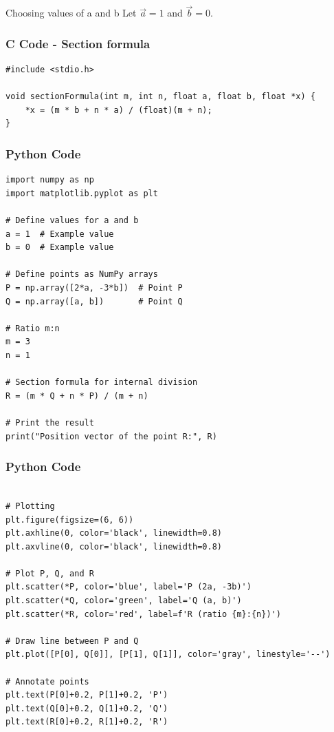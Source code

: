 \documentclass{beamer}
\begin{document}
\begin{frame}{Choosing values of a and b}
Let $\vec{a}=1$ and $\vec{b}=0$.
\end{frame}

\begin{frame}[fragile]
    \frametitle{C Code - Section formula}

    \begin{lstlisting}
#include <stdio.h>

void sectionFormula(int m, int n, float a, float b, float *x) {
    *x = (m * b + n * a) / (float)(m + n);
}

    \end{lstlisting}
\end{frame}

\begin{frame}[fragile]
    \frametitle{Python Code}

    \begin{lstlisting}
import numpy as np
import matplotlib.pyplot as plt

# Define values for a and b
a = 1  # Example value
b = 0  # Example value

# Define points as NumPy arrays
P = np.array([2*a, -3*b])  # Point P
Q = np.array([a, b])       # Point Q

# Ratio m:n
m = 3
n = 1

# Section formula for internal division
R = (m * Q + n * P) / (m + n)

# Print the result
print("Position vector of the point R:", R)

    \end{lstlisting}
\end{frame}

\begin{frame}[fragile]
    \frametitle{Python Code}

    \begin{lstlisting}

# Plotting
plt.figure(figsize=(6, 6))
plt.axhline(0, color='black', linewidth=0.8)
plt.axvline(0, color='black', linewidth=0.8)

# Plot P, Q, and R
plt.scatter(*P, color='blue', label='P (2a, -3b)')
plt.scatter(*Q, color='green', label='Q (a, b)')
plt.scatter(*R, color='red', label=f'R (ratio {m}:{n})')

# Draw line between P and Q
plt.plot([P[0], Q[0]], [P[1], Q[1]], color='gray', linestyle='--')

# Annotate points
plt.text(P[0]+0.2, P[1]+0.2, 'P')
plt.text(Q[0]+0.2, Q[1]+0.2, 'Q')
plt.text(R[0]+0.2, R[1]+0.2, 'R')

\end{lstlisting}
\end{frame}
\end{document}
